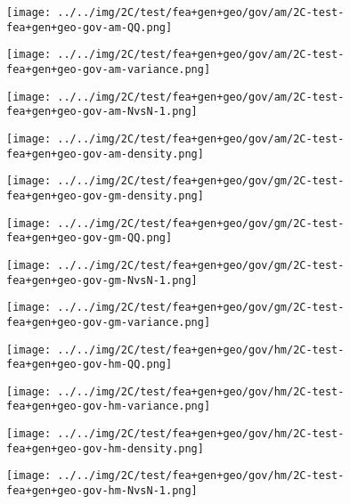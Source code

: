 \begin{figure}[H]
\centering	\texttt{[image: ../../img/2C/test/fea+gen+geo/gov/am/2C-test-fea+gen+geo-gov-am-QQ.png]}
\end{figure}
\begin{figure}[H]
\centering	\texttt{[image: ../../img/2C/test/fea+gen+geo/gov/am/2C-test-fea+gen+geo-gov-am-variance.png]}
\end{figure}
\begin{figure}[H]
\centering	\texttt{[image: ../../img/2C/test/fea+gen+geo/gov/am/2C-test-fea+gen+geo-gov-am-NvsN-1.png]}
\end{figure}
\begin{figure}[H]
\centering	\texttt{[image: ../../img/2C/test/fea+gen+geo/gov/am/2C-test-fea+gen+geo-gov-am-density.png]}
\end{figure}
\begin{figure}[H]
\centering	\texttt{[image: ../../img/2C/test/fea+gen+geo/gov/gm/2C-test-fea+gen+geo-gov-gm-density.png]}
\end{figure}
\begin{figure}[H]
\centering	\texttt{[image: ../../img/2C/test/fea+gen+geo/gov/gm/2C-test-fea+gen+geo-gov-gm-QQ.png]}
\end{figure}
\begin{figure}[H]
\centering	\texttt{[image: ../../img/2C/test/fea+gen+geo/gov/gm/2C-test-fea+gen+geo-gov-gm-NvsN-1.png]}
\end{figure}
\begin{figure}[H]
\centering	\texttt{[image: ../../img/2C/test/fea+gen+geo/gov/gm/2C-test-fea+gen+geo-gov-gm-variance.png]}
\end{figure}
\begin{figure}[H]
\centering	\texttt{[image: ../../img/2C/test/fea+gen+geo/gov/hm/2C-test-fea+gen+geo-gov-hm-QQ.png]}
\end{figure}
\begin{figure}[H]
\centering	\texttt{[image: ../../img/2C/test/fea+gen+geo/gov/hm/2C-test-fea+gen+geo-gov-hm-variance.png]}
\end{figure}
\begin{figure}[H]
\centering	\texttt{[image: ../../img/2C/test/fea+gen+geo/gov/hm/2C-test-fea+gen+geo-gov-hm-density.png]}
\end{figure}
\begin{figure}[H]
\centering	\texttt{[image: ../../img/2C/test/fea+gen+geo/gov/hm/2C-test-fea+gen+geo-gov-hm-NvsN-1.png]}
\end{figure}
